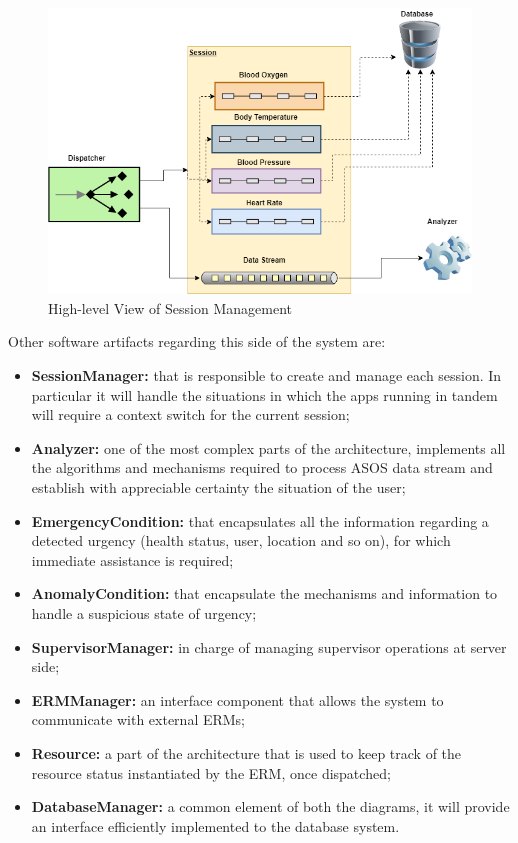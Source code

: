 \begin{flushleft}
{\begin{figure}[H]
	\includegraphics[scale=0.5]{images/uml/server_schema.png}
	\caption{High-level View of Session Management}
	\label{Figure 4}
\end{figure}

Other software artifacts regarding this side of the system are:
\begin{itemize}
	\item \textbf{SessionManager:} that is responsible to create and manage each session. In particular it will handle the situations in which the apps running in tandem will require a context switch for the current session;
	\item \textbf{Analyzer:} one of the most complex parts of the architecture, implements all the algorithms and mechanisms required to process ASOS data stream and establish with appreciable certainty the situation of the user;
	\item \textbf{EmergencyCondition:} that encapsulates all the information regarding a detected urgency (health status, user, location and so on), for which immediate assistance is required;
	\item \textbf{AnomalyCondition:} that encapsulate the mechanisms and information to handle a suspicious state of urgency;
	\item \textbf{SupervisorManager:} in charge of managing supervisor operations at server side;
	\item \textbf{ERMManager:} an interface component that allows the system to communicate with external ERMs;
	\item \textbf{Resource:} a part of the architecture that is used to keep track of the resource status instantiated by the ERM, once dispatched;
	\item \textbf{DatabaseManager:} a common element of both the diagrams, it will provide an interface efficiently implemented to the database system.
\end{itemize}

}
\end{flushleft}
